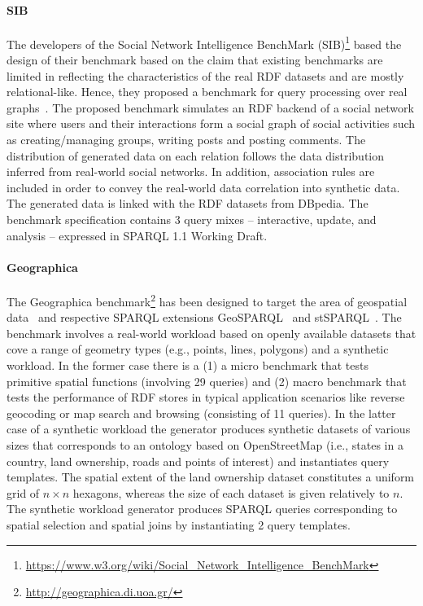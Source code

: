\paragraph{SIB} The developers of the Social Network Intelligence BenchMark (SIB)\footnote{\url{https://www.w3.org/wiki/Social_Network_Intelligence_BenchMark}} based the design of their benchmark based on the claim that existing benchmarks are limited in reflecting the characteristics of the real RDF datasets and are mostly relational-like. Hence, they proposed a benchmark for  query processing over real graphs~\cite{sib}. The proposed benchmark simulates an RDF backend of a social network site where users and their interactions form a social graph of social activities such as creating/managing groups, writing posts and posting comments. The distribution of generated data on each relation follows the data distribution inferred from real-world social networks. In addition, association rules are included in order to convey the real-world data correlation into synthetic data. The  generated data is linked with the RDF datasets from DBpedia. The benchmark specification contains 3 query mixes -- interactive, update, and analysis -- expressed in SPARQL 1.1 Working Draft.

\paragraph{Geographica} The Geographica benchmark\footnote{\url{http://geographica.di.uoa.gr/}} has been designed to target the area of geospatial data~\cite{DBLP:conf/semweb/GarbisKK13} and respective SPARQL extensions GeoSPARQL~\cite{battle2012enabling} and stSPARQL~\cite{koubarakis2010modeling}. The benchmark involves a real-world workload based on openly available datasets that cove a range of geometry types (e.g., points, lines, polygons) and  a synthetic workload. In the former case there is a (1) a micro benchmark that tests primitive spatial functions (involving 29 queries) and (2) macro benchmark that tests the performance of RDF stores in typical application scenarios like reverse geocoding or map search and browsing (consisting of 11 queries). In the latter case of a synthetic workload the generator produces synthetic datasets of various sizes that corresponds to an ontology based on OpenStreetMap (i.e., states in a country, land ownership, roads and  points of interest) and instantiates query templates. The spatial extent of the land ownership dataset constitutes a uniform grid of $n \times n$ hexagons, whereas the size of each dataset is given relatively to $n$. The synthetic workload generator produces SPARQL queries corresponding to spatial selection and spatial joins by instantiating 2 query templates.


